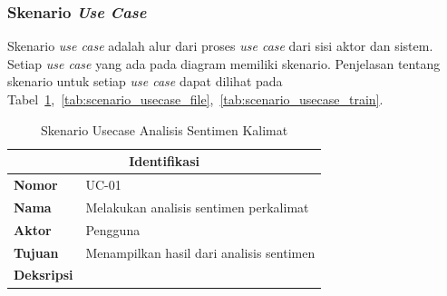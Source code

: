 \subsubsection{Skenario \emph{Use Case}}
Skenario \emph{use case} adalah alur dari proses \emph{use case} dari sisi aktor dan sistem.
Setiap \emph{use case} yang ada pada diagram memiliki skenario. Penjelasan tentang skenario untuk setiap
\emph{use case} dapat dilihat pada Tabel~\ref{tab:scenario_usecase_kalimat},~\ref{tab:scenario_usecase_file},~\ref{tab:scenario_usecase_train}.

\begin{longtable}[c]{|ll|}
  \caption{Skenario Usecase Analisis Sentimen Kalimat}
  \label{tab:scenario_usecase_kalimat}                                                                                                                                                                                                                         \\
  \hline
  \multicolumn{2}{|c|}{\textbf{Identifikasi}}                                                                                                                                                                                                                  \\ \hline
  \endhead
  \multicolumn{1}{|l|}{\textbf{Nomor}}                                                                            & UC-01                                                                                                                                      \\ \hline
  \multicolumn{1}{|l|}{\textbf{Nama}}                                                                             & Melakukan analisis sentimen perkalimat                                                                                                     \\ \hline
  \multicolumn{1}{|l|}{\textbf{Aktor}}                                                                            & Pengguna                                                                                                                                   \\ \hline
  \multicolumn{1}{|l|}{\textbf{Tujuan}}                                                                           & Menampilkan hasil dari analisis sentimen                                                                                                   \\ \hline
  \multicolumn{1}{|l|}{\textbf{Deksripsi}}                                                                        &

\end{longtable}
